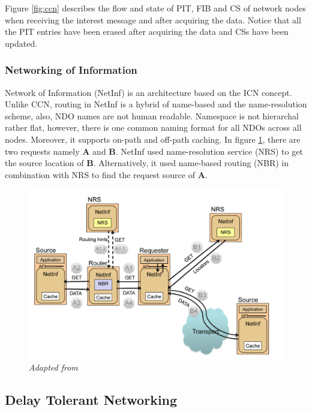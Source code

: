 Figure \ref{fig:ccn} describes the flow and state of PIT, FIB and CS of network nodes when receiving the interest message and after acquiring the data. Notice that all the PIT entries have been erased after acquiring the data and CSs have been updated.


\subsubsection{Networking of Information }
Network of Information (NetInf) is an architecture based on the ICN concept. Unlike CCN, routing in NetInf is a hybrid of name-based  and the name-resolution scheme, also, NDO names are not human readable. Namespace is not hierarchal rather flat, however, there is one common naming format for all NDOs across all nodes. Moreover, it supports on-path and off-path caching\cite{Dannewitz:2013:NII:2459510.2459643}. In figure \ref{fig:netinf}, there are two requests namely \textbf{A} and \textbf{B}.  NetInf used name-resolution service (NRS) to get the source location of \textbf{B}. Alternatively, it used name-based routing (NBR) in combination with NRS to find the request source of \textbf{A}.

\begin{figure}[H]
	\centering
	\includegraphics[scale=0.4]{images/netinf.png}
	\caption{\textit{Adapted from \cite{Dannewitz:2013:NII:2459510.2459643}}}
	\label{fig:netinf}
\end{figure}



\subsection{Delay Tolerant Networking}

